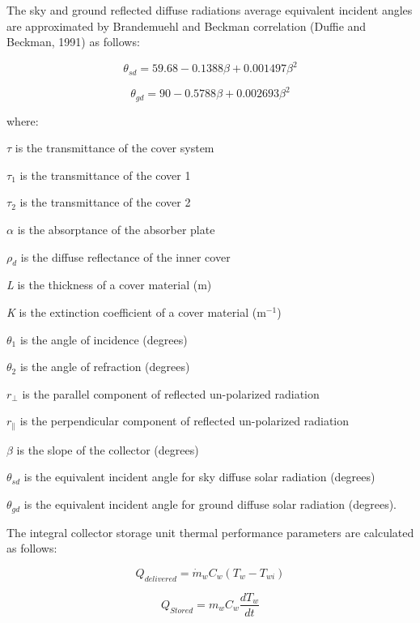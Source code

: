 The sky and ground reflected diffuse radiations average equivalent incident angles are approximated by Brandemuehl and Beckman correlation (Duffie and Beckman, 1991) as follows:

\begin{equation}
{\theta_{sd}} = 59.68 - 0.1388\beta  + 0.001497{\beta ^2}
\end{equation}

\begin{equation}
{\theta_{gd}} = 90 - 0.5788\beta  + 0.002693{\beta ^2}
\end{equation}

where:

\({\tau}\) is the transmittance of the cover system

\({\tau}_{1}\) is the transmittance of the cover 1

\({\tau}_{2}\) is the transmittance of the cover 2

\({\alpha}\) is the absorptance of the absorber plate

\({\rho}_{d}\) is the diffuse reflectance of the inner cover

\emph{L} is the thickness of a cover material (m)

\emph{K} is the extinction coefficient of a cover material (m\(^{-1}\))

\({\theta}_{1}\) is the angle of incidence (degrees)

\({\theta}_{2}\) is the angle of refraction (degrees)

\({r_ \bot }\) is the parallel component of reflected un-polarized radiation

\({r_\parallel }\) is the perpendicular component of reflected un-polarized radiation

\({\beta}\) is the slope of the collector (degrees)

\({\theta}_{sd}\) is the equivalent incident angle for sky diffuse solar radiation (degrees)

\({\theta}_{gd}\) is the equivalent incident angle for ground diffuse solar radiation (degrees).

The integral collector storage unit thermal performance parameters are calculated as follows:

\begin{equation}
{Q_{delivered}} = {\dot m_w}{C_w}\left( {{T_w} - {T_{wi}}} \right)
\end{equation}

\begin{equation}
{Q_{Stored}} = {m_w}{C_w}\frac{{d{T_w}}}{{dt}}
\end{equation}


